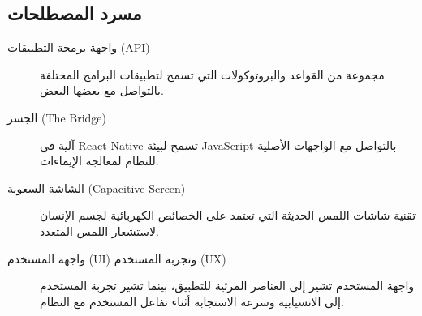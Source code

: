 \documentclass[12pt,a4paper]{report}
\begin{document}
\begin{Arabic}
\chapter*{مسرد المصطلحات}

\begin{description}
\item[واجهة برمجة التطبيقات (API)] مجموعة من القواعد والبروتوكولات التي تسمح لتطبيقات البرامج المختلفة بالتواصل مع بعضها البعض.

\item[الجسر (The Bridge)] آلية في React Native تسمح لبيئة JavaScript بالتواصل مع الواجهات الأصلية للنظام لمعالجة الإيماءات.

\item[الشاشة السعوية (Capacitive Screen)] تقنية شاشات اللمس الحديثة التي تعتمد على الخصائص الكهربائية لجسم الإنسان لاستشعار اللمس المتعدد.

\item[واجهة المستخدم (UI) وتجربة المستخدم (UX)] واجهة المستخدم تشير إلى العناصر المرئية للتطبيق، بينما تشير تجربة المستخدم إلى الانسيابية وسرعة الاستجابة أثناء تفاعل المستخدم مع النظام.
\end{description}
\end{Arabic}

\titlespacing*{\chapter}{0pt}{50pt}{40pt}







\end{document}
